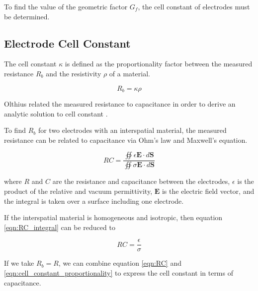   \par To find the value of the geometric factor $G_f$, the cell constant of electrodes must be determined.
  
  
  \subsection{Electrode Cell Constant}
  
  \par The cell constant $\kappa$ is defined as the proportionality factor between the measured resistance $R_b$ and the resistivity $\rho$ of a material.
  
  \begin{equation}
      R_b = \kappa \rho
      \label{eqn:cell_constant_proportionality}
  \end{equation}
  
  \noindent  Olthius related the measured resistance to capacitance in order to derive an analytic solution to cell constant \cite{olthuis_theoretical_1995}. 
  
  \par To find $R_b$ for two electrodes with an interspatial material, the measured resistance can be related to capacitance via Ohm's law and Maxwell's equation.
  
  \begin{equation}
      RC = \frac{\oiint \epsilon \boldsymbol{E} \cdot d\boldsymbol{S}}{\oiint \sigma\boldsymbol{E}\cdot d\boldsymbol{S}}
      \label{eqn:RC_integral}
  \end{equation}
  
  \noindent where $R$ and $C$ are the resistance and capacitance between the electrodes, $\epsilon$ is the product of the relative and vacuum permittivity, $\boldsymbol{E}$ is the electric field vector, and the integral is taken over a surface including one electrode.
  
  \par If the interspatial material is homogeneous and isotropic, then equation \ref{eqn:RC_integral} can be reduced to
  
  \begin{equation}
      RC = \frac{\epsilon}{\sigma}
      \label{eqn:RC}
  \end{equation}
  
  \par If we take $R_b = R$, we can combine equation \ref{eqn:RC} and \ref{eqn:cell_constant_proportionality} to express the cell constant in terms of capacitance.
  
